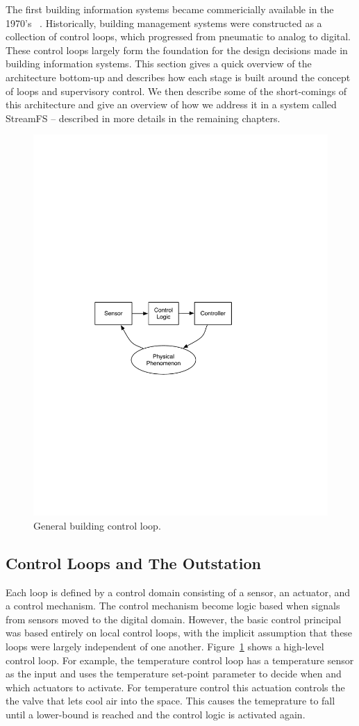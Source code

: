 
The first building information systems became commericially available in the 1970's ~\cite{gardner1987energy}.  
Historically, building management 
systems were constructed as a collection of control loops, which progressed from pneumatic to analog to digital.
These control loops largely form the foundation for the design decisions made in building information systems.  
This section gives a quick overview of the architecture bottom-up and describes how each stage is built around
the concept of loops and supervisory control.  We then describe some of the short-comings of this architecture
and give an overview of how we address it in a system called StreamFS -- described in more details in
the remaining chapters.

\begin{figure}[t!] %
\centering
\includegraphics[width=0.50\columnwidth]{figs/control_loop}
\caption{General building control loop.}
\label{fig:control_loop}
\end{figure}

\subsection{Control Loops and The Outstation}
\label{sec:control_loops}
Each loop is defined by a control domain consisting of a sensor, an actuator, and a control mechanism.  The control mechanism
become logic based when signals from sensors moved to the digital domain.  However, the basic control principal was based
entirely on local control loops, with the implicit assumption that these loops were largely independent of one another.
Figure~\ref{fig:control_loop} shows a high-level control loop.  For example, the temperature control loop has a temperature
sensor as the input and uses the temperature set-point parameter to decide when and which actuators to activate.
For temperature control this actuation controls the the valve that lets cool air into the space.  This causes the temeprature
to fall until a lower-bound is reached and the control logic is activated again.

